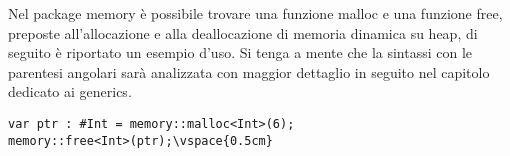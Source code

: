 Nel package memory è possibile trovare una funzione malloc e una funzione free, preposte all’allocazione e alla deallocazione di memoria dinamica su heap, 
di seguito è riportato un esempio d’uso. Si tenga a mente che la sintassi con le parentesi angolari sarà analizzata con maggior 
dettaglio in seguito nel capitolo dedicato ai generics. \\


\vspace{0.5cm}
\begin{lstlisting}[frame=single]
var ptr : #Int = memory::malloc<Int>(6);
memory::free<Int>(ptr);\vspace{0.5cm}
\end{lstlisting}
\vspace{0.5cm}
